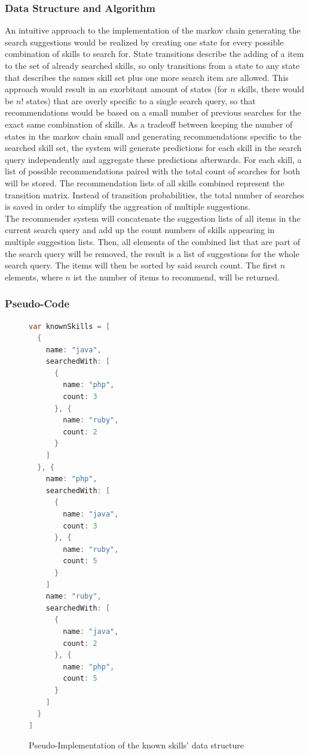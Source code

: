 \subsubsection{Data Structure and Algorithm}
An intuitive approach to the implementation of the markov chain generating the search suggestions would be realized by creating one state for every possible combination of skills to search for. State transitions describe the adding of a item to the set of already searched skills, so only transitions from a state to any state that describes the sames skill set plus one more search item are allowed. This approach would result in an exorbitant amount of states (for $n$ skills, there would be $n!$ states) that are overly specific to a single search query, so that recommendations would be based on a small number of previous searches for the exact same combination of skills.
As a tradeoff between keeping the number of states in the markov chain small and generating recommendations specific to the searched skill set, the system will generate predictions for each skill in the search query independently and aggregate these predictions afterwards. For each skill, a list of possible recommendations paired with the total count of searches for both will be stored. The recommendation lists of all skills combined represent the transition matrix. Instead of transition probabilities, the total number of searches is saved in order to simplify the aggreation of multiple suggestions.\\
The recommender system will concatenate the suggestion lists of all items in the current search query and add up the count numbers of skills appearing in multiple suggestion lists. Then, all elements of the combined list that are part of the search query will be removed, the result is a list of suggestions for the whole search query. The items will then be sorted by said search count. The first $n$ elements, where $n$ ist the number of items to recommend, will be returned.\\

\newpage

\subsubsection{Pseudo-Code}
\begin{figure}[!htp]
\begin{lstlisting}[language=Java]
var knownSkills = [
  {
    name: "java",
    searchedWith: [
      {
        name: "php",
        count: 3
      }, {
        name: "ruby",
        count: 2
      }
    ]
  }, {
    name: "php",
    searchedWith: [
      {
        name: "java",
        count: 3
      }, {
        name: "ruby",
        count: 5
      }
    ]
    name: "ruby",
    searchedWith: [
      {
        name: "java",
        count: 2
      }, {
        name: "php",
        count: 5
      }
    ]
  }
]
\end{lstlisting}
\caption[Data Structure: Known Skill]{Pseudo-Implementation of the known skills' data structure}
\end{figure}

